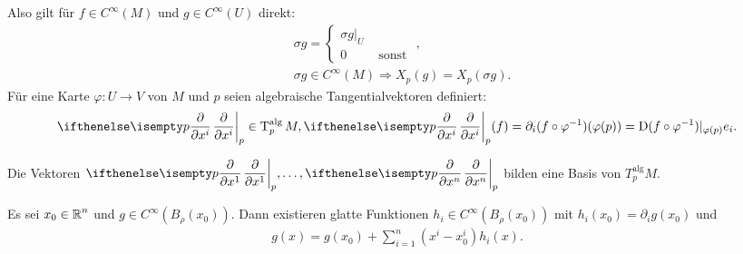 \begin{bem}
  Also gilt für $f \in C^{\infty}(M)$ und $g \in C^{\infty}(U)$ direkt:
  \begin{align*}
    & \sigma g =
    \begin{cases}
      \sigma g|_U & \\
      0 & \text{ sonst }
    \end{cases},\\
    & \sigma g \in C^{\infty}(M) 
    \Rightarrow X_p(g) = X_p(\sigma g).
  \end{align*}
  Für eine Karte $\varphi \colon U \to V$ von $M$ und $p$ seien algebraische Tangentialvektoren definiert:
  \begin{align*}
    \pdifffrac[p]{}{x^i} \in \T_p^{\text{alg}}M, \pdifffrac[p]{}{x^i}(f) = \partial_i(f \circ \varphi^{-1})(\varphi(p)) = \D(f \circ \varphi^{-1})|_{\varphi(p)}e_i.
  \end{align*}
\end{bem}

\begin{satz}
  Die Vektoren $\pdifffrac[p]{}{x^1},\ldots,\pdifffrac[p]{}{x^n}$ bilden eine Basis von $T_p^{\text{alg}}M$.
\end{satz}

\begin{lemma}
  Es sei $x_0 \in \operatorname{\mathbb{R}}^n$ und $g \in C^{\infty}(B_{\rho}(x_0))$.
  Dann existieren glatte Funktionen $h_i \in C^{\infty}(B_{\rho}(x_0))$ mit $h_i(x_0) = \partial_ig(x_0)$ und 
  \begin{align*}
    g(x) = g(x_0) + \sum_{i=1}^n(x^i-x_0^i)h_i(x).
  \end{align*}
\end{lemma}

